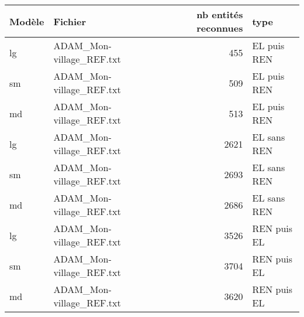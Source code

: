\begin{tabular}{llrl}
\toprule
Modèle &                  Fichier &  nb entités reconnues &        type \\
\midrule
    lg & ADAM\_Mon-village\_REF.txt &                   455 & EL puis REN \\
    sm & ADAM\_Mon-village\_REF.txt &                   509 & EL puis REN \\
    md & ADAM\_Mon-village\_REF.txt &                   513 & EL puis REN \\
    lg & ADAM\_Mon-village\_REF.txt &                  2621 & EL sans REN \\
    sm & ADAM\_Mon-village\_REF.txt &                  2693 & EL sans REN \\
    md & ADAM\_Mon-village\_REF.txt &                  2686 & EL sans REN \\
    lg & ADAM\_Mon-village\_REF.txt &                  3526 & REN puis EL \\
    sm & ADAM\_Mon-village\_REF.txt &                  3704 & REN puis EL \\
    md & ADAM\_Mon-village\_REF.txt &                  3620 & REN puis EL \\
\bottomrule
\end{tabular}
